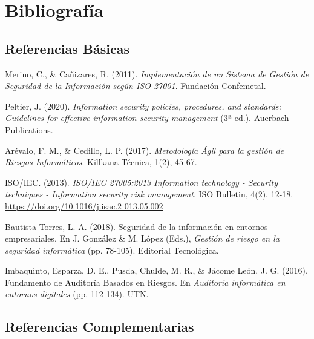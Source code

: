 \section{Bibliografía}


\subsection*{Referencias Básicas}

\hangindent=1in
Merino, C., \& Cañizares, R. (2011). \textit{Implementación de un Sistema de Gestión de Seguridad de la Información según ISO 27001}. Fundación Confemetal.

\hangindent=1in
Peltier, J. (2020). \textit{Information security policies, procedures, and standards: Guidelines for effective information security management} (3ª ed.). Auerbach Publications.

\hangindent=1in
Arévalo, F. M., \& Cedillo, L. P. (2017). \textit{Metodología Ágil para la gestión de Riesgos Informáticos}. Killkana Técnica, 1(2), 45-67.

\hangindent=1in
ISO/IEC. (2013). \textit{ISO/IEC 27005:2013 Information technology - Security techniques - Information security risk management}. ISO Bulletin, 4(2), 12-18. \href{https://doi.org/10.1016/j.isac.2013.05.002}{https://doi.org/10.1016/j.isac.2 013.05.002}

\hangindent=1in
Bautista Torres, L. A. (2018). Seguridad de la información en entornos empresariales. En J. González \& M. López (Eds.), \textit{Gestión de riesgo en la seguridad informática} (pp. 78-105). Editorial Tecnológica.

\hangindent=1in
Imbaquinto, Esparza, D. E., Pusda, Chulde, M. R., \& Jácome León, J. G. (2016). Fundamento de Auditoría Basados en Riesgos. En \textit{Auditoría informática en entornos digitales} (pp. 112-134). UTN.

\subsection*{Referencias Complementarias}
\pagebreak